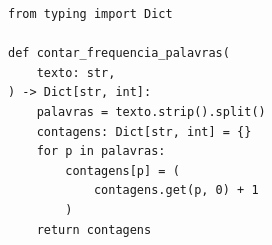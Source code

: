 \ifmostrarGabarito
\begin{verbatim}
from typing import Dict

def contar_frequencia_palavras(
    texto: str,
) -> Dict[str, int]:
    palavras = texto.strip().split()
    contagens: Dict[str, int] = {}
    for p in palavras:
        contagens[p] = (
            contagens.get(p, 0) + 1
        )
    return contagens
\end{verbatim}

\fi
